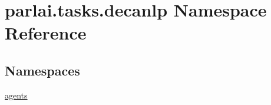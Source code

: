 \hypertarget{namespaceparlai_1_1tasks_1_1decanlp}{}\section{parlai.\+tasks.\+decanlp Namespace Reference}
\label{namespaceparlai_1_1tasks_1_1decanlp}
\subsection*{Namespaces}
\begin{DoxyCompactItemize}
\item 
 \hyperlink{namespaceparlai_1_1tasks_1_1decanlp_1_1agents}{agents}
\end{DoxyCompactItemize}
